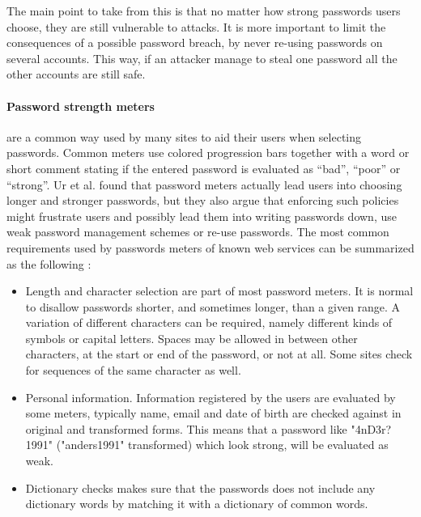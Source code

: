 \par The main point to take from this is that no matter how strong passwords users choose, they are still vulnerable to attacks. It is more important to limit the consequences of a possible password breach, by never re-using passwords on several accounts. This way, if an attacker manage to steal one password all the other accounts are still safe. 

\paragraph{Password strength meters} are a common way used by many sites to aid their users when selecting passwords. Common meters use colored progression bars together with a word or short comment stating if the entered password is evaluated as ``bad'', ``poor'' or ``strong''. Ur et al. \cite{password-meters2} found that password meters actually lead users into choosing longer and stronger passwords, but they also argue that enforcing such policies might frustrate users and possibly lead them into writing passwords down, use weak password management schemes or re-use passwords. The most common requirements used by passwords meters of known web services can be summarized as the following \cite{password-meters}:
\begin{itemize}
    \item{Length and character selection} are part of most password meters. It is normal to disallow passwords shorter, and sometimes longer, than a given range. A variation of different characters can be required, namely different kinds of symbols or capital letters. Spaces may be allowed in between other characters, at the start or end of the password, or not at all. Some sites check for sequences of the same character as well.
    \item{Personal information.} Information registered by the users are evaluated by some meters, typically name, email and date of birth are checked against in original and transformed forms. This means that a password like "4nD3r?1991" ("anders1991" transformed) which look strong, will be evaluated as weak.
    \item{Dictionary checks} makes sure that the passwords does not include any dictionary words by matching it with a dictionary of common words. 
\end{itemize}

%

